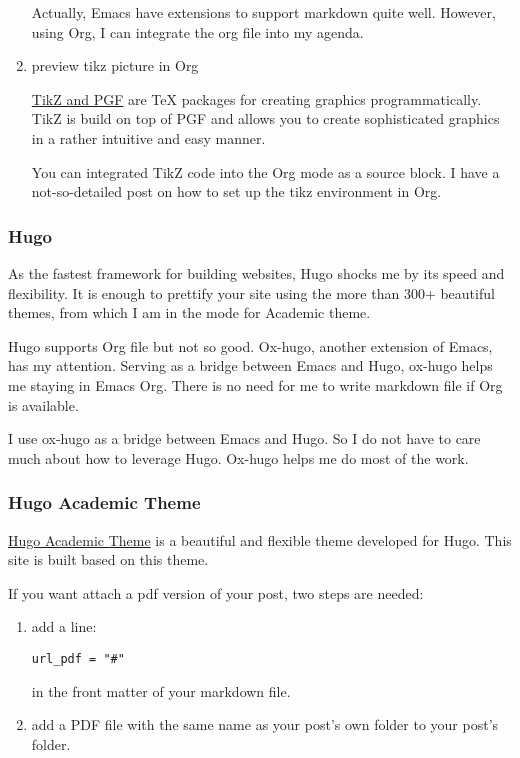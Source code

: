 \documentclass[koma,utopia,a4paper,captions=tableheading,11pt,listings-sv,microtype,paralist,colorlinks=true,urlcolor=blue]{org-article}
\begin{document}
\begin{enumerate}
Actually, Emacs have extensions to support markdown quite well. However, using
Org, I can integrate the org file into my agenda.


\item preview tikz picture in Org
\label{sec:orgab2630d}


\href{http://www.texample.net/tikz/}{TikZ and PGF} are \TeX{} packages for creating graphics programmatically. TikZ is
build on top of PGF and allows you to create sophisticated graphics in a rather
intuitive and easy manner.

You can integrated TikZ code into the Org mode as a source block. I have a
not-so-detailed post on how to set up the tikz environment in Org.
\end{enumerate}


\subsubsection{Hugo}
\label{sec:org3f30c08}


As the fastest framework for building websites, Hugo shocks me by its speed and
flexibility. It is enough to prettify your site using the more than 300+
beautiful themes, from which I am in the mode for Academic theme.

Hugo supports Org file but not so good. Ox-hugo, another extension of Emacs, has
my attention. Serving as a bridge between Emacs and Hugo, ox-hugo helps me
staying in Emacs Org. There is no need for me to write markdown file if Org is
available.

I use ox-hugo as a bridge between Emacs and Hugo. So I do not have to care much
about how to leverage Hugo. Ox-hugo helps me do most of the work.
\subsubsection{Hugo Academic Theme}
\label{sec:orgad8a7d5}


\href{https://github.com/gcushen/hugo-academic}{Hugo Academic Theme} is a beautiful and flexible theme developed for Hugo. This
site is built based on this theme.

If you want attach a pdf version of your post, two steps are needed:
\begin{enumerate}
\item add a line:
\begin{verbatim}
url_pdf = "#"
\end{verbatim}
in the front matter of your markdown file.
\item add a PDF file with the same name as your post’s own folder to your post’s
folder.
\end{enumerate}
\end{document}
